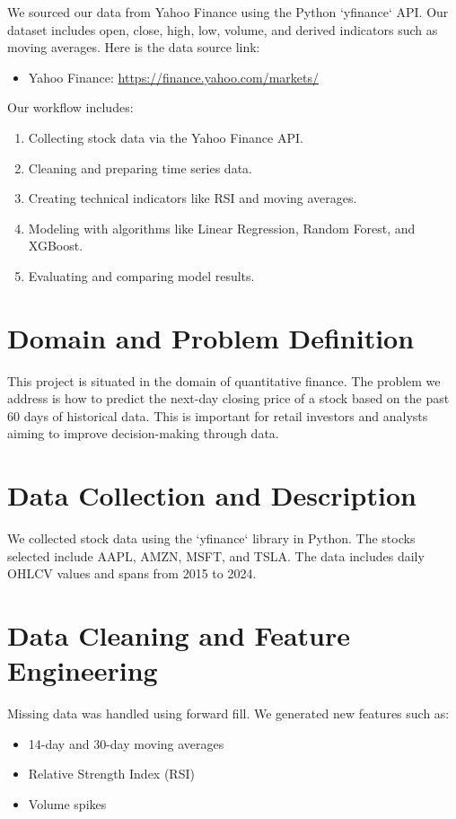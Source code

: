 \documentclass[runningheads]{llncs}
\begin{document}
{{We sourced our data from Yahoo Finance using the Python `yfinance` API. Our dataset includes open, close, high, low, volume, and derived indicators such as moving averages. Here is the data source link:

\begin{itemize}
    \item Yahoo Finance: \url{https://finance.yahoo.com/markets/}
\end{itemize}

Our workflow includes:
\begin{enumerate}
    \item Collecting stock data via the Yahoo Finance API.
    \item Cleaning and preparing time series data.
    \item Creating technical indicators like RSI and moving averages.
    \item Modeling with algorithms like Linear Regression, Random Forest, and XGBoost.
    \item Evaluating and comparing model results.
\end{enumerate}

\section{Domain and Problem Definition}
This project is situated in the domain of quantitative finance. The problem we address is how to predict the next-day closing price of a stock based on the past 60 days of historical data. This is important for retail investors and analysts aiming to improve decision-making through data.

\section{Data Collection and Description}
We collected stock data using the `yfinance` library in Python. The stocks selected include AAPL, AMZN, MSFT, and TSLA. The data includes daily OHLCV values and spans from 2015 to 2024.

\section{Data Cleaning and Feature Engineering}
Missing data was handled using forward fill. We generated new features such as:
\begin{itemize}
    \item 14-day and 30-day moving averages
    \item Relative Strength Index (RSI)
    \item Volume spikes
\end{itemize}

}}
\end{document}
